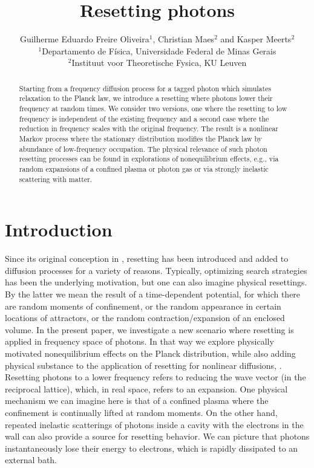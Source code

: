 \documentclass[a4paper,12pt,reqno,superscriptaddress,nofootinbib]{revtex4}
\theoremstyle{plain}
\theoremstyle{definition}
\theoremstyle{remark}
\newcommand{\0}{^{(0)}}
\newcommand{\1}{^{(1)}}
\newcommand{\2}{^{(2)}}
\begin{document}
	\title{Resetting photons}	
	\author{Guilherme Eduardo Freire Oliveira$^1$, Christian Maes$^2$ and Kasper Meerts$^{2}$\\ $^1$Departamento de Física, Universidade Federal de Minas Gerais \\ $^2$Instituut voor Theoretische Fysica, KU Leuven}

\begin{abstract}
Starting from a frequency diffusion process for a tagged photon which simulates relaxation to the Planck law, we introduce a resetting where photons lower their frequency at random times.
We consider two versions, one where the resetting to low frequency is independent of the existing frequency and a second case where the reduction in frequency scales with the original frequency.  The result is a nonlinear Markov process where the stationary distribution modifies the Planck law by abundance of low-frequency occupation. The physical relevance of such photon resetting processes can be found in explorations of nonequilibrium effects, e.g., via random expansions of a confined plasma or photon gas or via strongly inelastic scattering with matter.
\end{abstract}
\maketitle

\section{Introduction}
Since its original conception in \cite{tong1,evans1,evans2,evans3}, resetting has been introduced and added to diffusion processes for a variety of reasons.  Typically, optimizing search strategies has been the underlying motivation, but one can also imagine physical resettings.  By the latter we mean the result of a time-dependent potential, for which there are random moments of confinement, or the random appearance in certain locations of attractors, or the random contraction/expansion of an enclosed volume.  In the present paper, we investigate a new scenario where resetting is applied in frequency space of photons.  In that way we explore physically motivated nonequilibrium effects on the Planck distribution, while also adding physical substance to the application of resetting for nonlinear diffusions, \cite{przem}.\\

Resetting photons to a lower frequency refers to reducing the wave vector (in the reciprocal lattice), which, in real space, refers to an expansion. One physical mechanism we can imagine here is that of a confined plasma where the confinement is continually lifted at random moments. On the other hand, repeated inelastic scatterings of photons inside a cavity with the electrons in the wall can also provide a source for resetting behavior. We can picture that photons instantaneously lose their energy to electrons, which is rapidly dissipated to an external bath.\\ 
\end{document}
